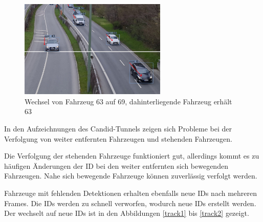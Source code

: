 \documentclass[conference]{IEEEtran}
\begin{document}
	\begin{figure}[!h]
		\begin{center}
			\includegraphics[width=7cm]{Media/switch4.jpg}
			\caption{Wechsel von Fahrzeug 63 auf 69, dahinterliegende Fahrzeug erhält 63}
			\label{track6}
		\end{center}
	\end{figure}

	
	In den Aufzeichnungen des Candid-Tunnels zeigen sich Probleme bei der Verfolgung von weiter entfernten Fahrzeugen und stehenden Fahrzeugen.
	
	Die Verfolgung der stehenden Fahrzeuge funktioniert gut, allerdings kommt es zu
	häufigen Änderungen der ID bei den weiter entfernten sich bewegenden Fahrzeugen.
	Nahe sich bewegende Fahrzeuge können zuverlässig verfolgt werden.
	
	Fahrzeuge mit fehlenden Detektionen erhalten ebenfalls neue IDs nach mehreren
	Frames. Die IDs werden zu schnell verworfen, wodurch neue IDs erstellt werden.
	Der wechselt auf neue IDs ist in den Abbildungen \ref{track1} bis \ref{track2} 
	gezeigt.
	
\end{document}
